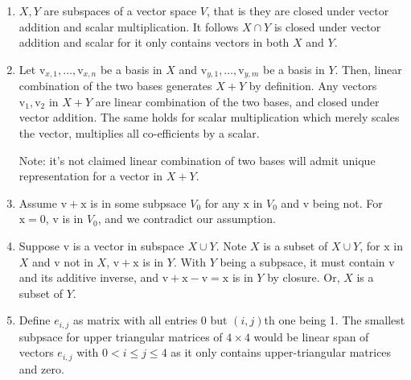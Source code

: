 \documentclass{article}
\newcommand{\vv}{\mathrm{v}}
\newcommand{\zero}{\mathrm{0}}
\begin{document}
\begin{enumerate}[label=\textbf{7.\arabic*.}]
    \item $X, Y$ are subspaces of a vector space $V$, that is they are closed
    under vector addition and scalar multiplication. It follows $X\cap Y$ is
    closed under vector addition and scalar for it only contains vectors in both
    $X$ and $Y$.

    \item Let $\vv_{x, 1},\ldots,\vv_{x, n}$ be a basis in $X$ and
    $\vv_{y, 1},\ldots,\vv_{y,m}$ be a basis in $Y$. Then, linear combination
    of the two bases generates $X+Y$ by definition. Any vectors $\vv_1, \vv_2$
    in $X+Y$ are linear combination of the two bases, and closed under
    vector addition. The same holds for scalar multiplication which merely
    scales the vector, multiplies all co-efficients by a scalar.

    Note: it's not claimed linear combination of two bases will admit
    unique representation for a vector in $X+Y$.

    \item Assume $\vv+\mathrm{x}$ is in some subpsace $V_0$ for any $\mathrm{x}$
    in $V_0$ and $\vv$ being not. For $\mathrm{x} = \zero$, $\vv$ is in
    $V_0$, and we contradict our assumption.
    
    \item Suppose $\vv$ is a vector in subspace $X\cup Y$. Note $X$ is a subset
    of $X\cup Y$, for $\mathrm{x}$ in $X$ and $\vv$ not in $X$,
    $\vv + \mathrm{x}$ is in $Y$. With $Y$ being a subpsace, it must contain
    $\vv$ and its additive inverse, and $\vv + \mathrm{x} - \vv = \mathrm{x}$
    is in $Y$ by closure. Or, $X$ is a subset of $Y$.

    \item Define $e_{i, j}$ as matrix with all entries 0 but $(i, j)$th
    one being 1. The smallest subpsace for upper triangular matrices of
    $4\times 4$ would be linear span of vectors $e_{i, j}$ with
    $0< i\leq j\leq 4$ as it only contains upper-triangular matrices and zero.
\end{enumerate}
\end{document}
